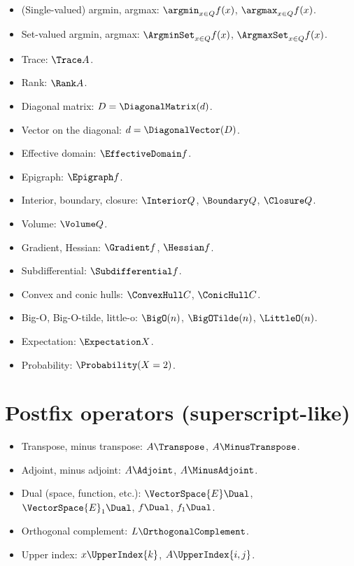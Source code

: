 \documentclass{article}
\begin{document}
  \begin{itemize}
    \item (Single-valued) argmin, argmax: $\argmin_{x \in Q} f(x)$, $\argmax_{x \in Q} f(x)$.
    \item Set-valued argmin, argmax: $\ArgminSet_{x \in Q} f(x)$, $\ArgmaxSet_{x \in Q} f(x)$.
    \item Trace: $\Trace A$.
    \item Rank: $\Rank A$.
    \item Diagonal matrix: $D = \DiagonalMatrix(d)$.
    \item Vector on the diagonal: $d = \DiagonalVector(D)$.
    \item Effective domain: $\EffectiveDomain f$.
    \item Epigraph: $\Epigraph f$.
    \item Interior, boundary, closure: $\Interior Q$, $\Boundary Q$, $\Closure Q$.
    \item Volume: $\Volume Q$.
    \item Gradient, Hessian: $\Gradient f$, $\Hessian f$.
    \item Subdifferential: $\Subdifferential f$.
    \item Convex and conic hulls: $\ConvexHull C$, $\ConicHull C$.
    \item Big-O, Big-O-tilde, little-o: $\BigO(n)$, $\BigOTilde(n)$, $\LittleO(n)$.
    \item Expectation: $\Expectation X$.
    \item Probability: $\Probability(X = 2)$.
  \end{itemize}

  \section{Postfix operators (superscript-like)}

  \begin{itemize}
    \item Transpose, minus transpose: $A\Transpose$, $A\MinusTranspose$.
    \item Adjoint, minus adjoint: $A\Adjoint$, $A\MinusAdjoint$.
    \item Dual (space, function, etc.): $\VectorSpace{E}\Dual$, $\VectorSpace{E}_1\Dual$, $f\Dual$, $f_1\Dual$.
    \item Orthogonal complement: $L\OrthogonalComplement$.
    \item Upper index: $x\UpperIndex{k}$, $A\UpperIndex{i, j}$.
  \end{itemize}
\end{document}
